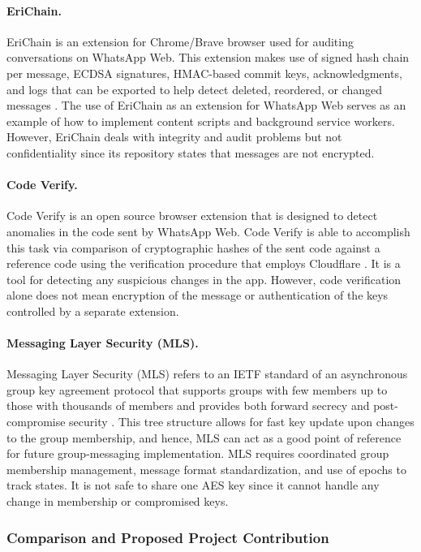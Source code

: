 \documentclass[11pt]{article}
\begin{document}
\paragraph{EriChain.}
EriChain is an extension for Chrome/Brave browser used for auditing conversations on WhatsApp Web. This extension makes use of signed hash chain per message, ECDSA signatures, HMAC-based commit keys, acknowledgments, and logs that can be exported to help detect deleted, reordered, or changed messages \cite{erichain}. The use of EriChain as an extension for WhatsApp Web serves as an example of how to implement content scripts and background service workers. However, EriChain deals with integrity and audit problems but not confidentiality since its repository states that messages are not encrypted.

\paragraph{Code Verify.}
Code Verify is an open source browser extension that is designed to detect anomalies in the code sent by WhatsApp Web. Code Verify is able to accomplish this task via comparison of cryptographic hashes of the sent code against a reference code using the verification procedure that employs Cloudflare \cite{code-verify}. It is a tool for detecting any suspicious changes in the app. However, code verification alone does not mean encryption of the message or authentication of the keys controlled by a separate extension. 

\paragraph{Messaging Layer Security (MLS).}
Messaging Layer Security (MLS) refers to an IETF standard of an asynchronous group key agreement protocol that supports groups with few members up to those with thousands of members and provides both forward secrecy and post-compromise security  \cite{mls}. This tree structure allows for fast key update upon changes to the group membership, and hence, MLS can act as a good point of reference for future group-messaging implementation. MLS requires coordinated group membership management, message format standardization, and use of epochs to track states. It is not safe to share one AES key since it cannot handle any change in membership or compromised keys.

\subsubsection{Comparison and Proposed Project Contribution}
\end{document}
